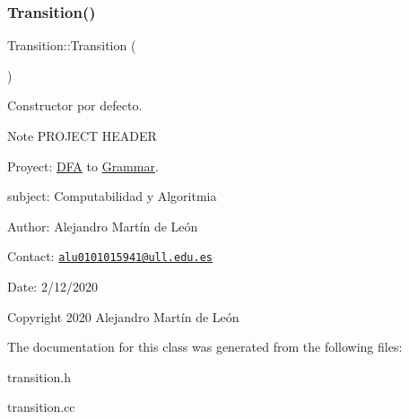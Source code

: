 \subsubsection{\texorpdfstring{Transition()}{Transition()}}
{\footnotesize\ttfamily Transition\+::\+Transition (\begin{DoxyParamCaption}{ }\end{DoxyParamCaption})}



Constructor por defecto. 

\begin{DoxyNote}{Note}
P\+R\+O\+J\+E\+CT H\+E\+A\+D\+ER 

Proyect\+: \hyperlink{classDFA}{D\+FA} to \hyperlink{classGrammar}{Grammar}. 

subject\+: Computabilidad y Algoritmia 

Author\+: Alejandro Martín de León 

Contact\+: \href{mailto:alu0101015941@ull.edu.es}{\tt alu0101015941@ull.\+edu.\+es} 

Date\+: 2/12/2020 

Copyright 2020 Alejandro Martín de León 
\end{DoxyNote}


The documentation for this class was generated from the following files\+:\begin{DoxyCompactItemize}
\item 
transition.\+h\item 
transition.\+cc\end{DoxyCompactItemize}
